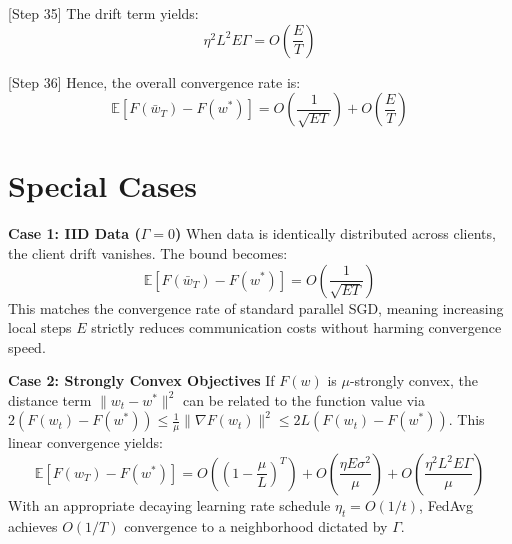 \documentclass{article}
\begin{document}
[Step 35] The drift term yields:
$$ \eta^2 L^2 E \Gamma = O\left(\frac{E}{T}\right) $$

[Step 36] Hence, the overall convergence rate is:
$$ \mathbb{E}[F(\bar{w}_T) - F(w^*)] = O\left(\frac{1}{\sqrt{ET}}\right) + O\left(\frac{E}{T}\right) $$

\section*{Special Cases}
\textbf{Case 1: IID Data ($\Gamma = 0$)}
When data is identically distributed across clients, the client drift vanishes. The bound becomes:
$$ \mathbb{E}[F(\bar{w}_T) - F(w^*)] = O\left(\frac{1}{\sqrt{ET}}\right) $$
This matches the convergence rate of standard parallel SGD, meaning increasing local steps $E$ strictly reduces communication costs without harming convergence speed.

\textbf{Case 2: Strongly Convex Objectives}
If $F(w)$ is $\mu$-strongly convex, the distance term $\|w_t - w^*\|^2$ can be related to the function value via $2(F(w_t) - F(w^*)) \leq \frac{1}{\mu}\|\nabla F(w_t)\|^2 \leq 2L(F(w_t) - F(w^*))$. This linear convergence yields:
$$ \mathbb{E}[F(w_T) - F(w^*)] = O\left( \left(1 - \frac{\mu}{L}\right)^T \right) + O\left(\frac{\eta E \sigma^2}{\mu}\right) + O\left(\frac{\eta^2 L^2 E \Gamma}{\mu}\right) $$
With an appropriate decaying learning rate schedule $\eta_t = O(1/t)$, FedAvg achieves $O(1/T)$ convergence to a neighborhood dictated by $\Gamma$.

\end{document}
